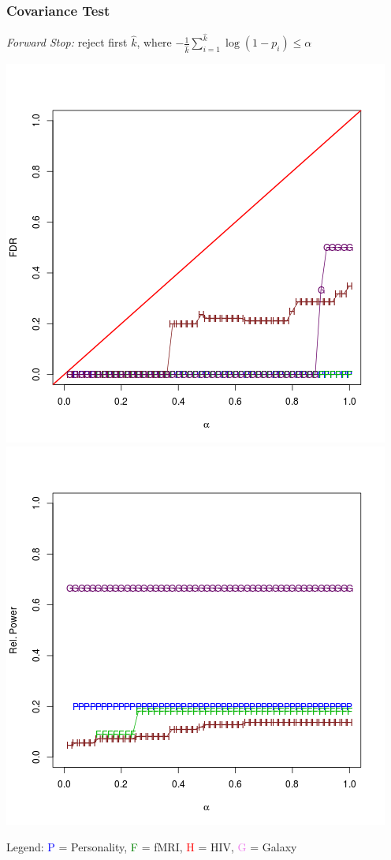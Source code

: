 \documentclass{beamer}
\begin{document}
\begin{frame}
\frametitle{Covariance Test}
\emph{Forward Stop:} reject first $\hat{k}$, where $-\frac{1}{\hat{k}}\sum_{i=1}^{\hat{k}} \log(1-p_i) \leq \alpha$

\begin{center}
\includegraphics[scale = 0.3]{ress_c_fs_type1.png}
\includegraphics[scale = 0.3]{ress_c_fs_power.png}
\end{center}

Legend: \textcolor{blue}{P} = Personality, \textcolor{green}{F} = fMRI,
\textcolor{red}{H} = HIV, \textcolor{violet}{G} = Galaxy
\end{frame}
\end{document}
